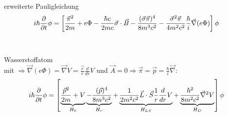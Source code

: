 




{\Huge
erweiterte Pauligleichung
\\
\begin{align*}
i\hbar \pdiff_t \phi =  \left[\frac{\vec \pi^2}{2m} +e\Phi - \frac{\hbar e}{2mc}\vec\sigma\cdot\vec B - \frac{(\vec\sigma\vec\pi)^4 }{8m^3c^2} - \frac{\vec\sigma^2\vec\pi }{4m^2c^2}\frac{\hbar}{i}\vec\nabla(e\Phi)  \right]\phi 
\end{align*}
\\
\\
Wasserstoffatom\\
mit \(\Rightarrow \vec\nabla(e\Phi)= \vec\nabla V=\frac{\vec r}{r}\frac{d}{dr}V \) und \(\vec A=0 \Rightarrow \vec \pi = \vec p = \frac{\hbar}{i}\vec \nabla\):
\\
 \begin{align*}
 i\hbar\pdiff_t \phi  = \left[\underbr{ \frac{\vec p^2}{2m}  +V}_{H_0} \underbr{- \frac{(\vec p)^4 }{8m^3c^2}}_{H_r} + \underbr{\frac{1 }{2m^2c^2}\vec L\cdot\vec S \frac{1}{r}\frac{d}{dr}V}_{H_{LS}} + \underbr{\frac{\hbar^2 }{8m^2c^2}\vec \nabla^2V}_{H_D} \right]\phi
\end{align*}

}%

